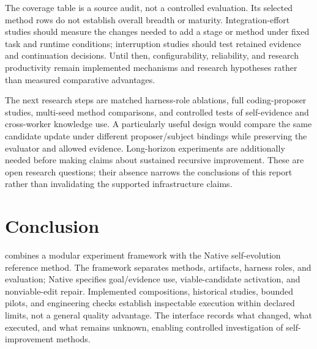 The coverage table is a source audit, not a controlled evaluation. Its selected method rows do not establish overall breadth or maturity. Integration-effort studies should measure the changes needed to add a stage or method under fixed task and runtime conditions; interruption studies should test retained evidence and continuation decisions. Until then, configurability, reliability, and research productivity remain implemented mechanisms and research hypotheses rather than measured comparative advantages.

The next research steps are matched harness-role ablations, full coding-proposer studies, multi-seed method comparisons, and controlled tests of self-evidence and cross-worker knowledge use. A particularly useful design would compare the same candidate update under different proposer/subject bindings while preserving the evaluator and allowed evidence. Long-horizon experiments are additionally needed before making claims about sustained recursive improvement. These are open research questions; their absence narrows the conclusions of this report rather than invalidating the supported infrastructure claims.

\section{Conclusion}
\proteus{} combines a modular experiment framework with the Native self-evolution reference method. The framework separates methods, artifacts, harness roles, and evaluation; Native specifies goal/evidence use, viable-candidate activation, and nonviable-edit repair. Implemented compositions, historical studies, bounded pilots, and engineering checks establish inspectable execution within declared limits, not a general quality advantage. The interface records what changed, what executed, and what remains unknown, enabling controlled investigation of self-improvement methods.
